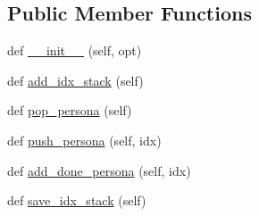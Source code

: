 \subsection*{Public Member Functions}
\begin{DoxyCompactItemize}
\item 
def \hyperlink{classparlai_1_1mturk_1_1tasks_1_1personachat_1_1personachat__rephrase_1_1worlds_1_1PersonasGenerator_a113657139eb52b53cdb044cefb9f5112}{\+\_\+\+\_\+init\+\_\+\+\_\+} (self, opt)
\item 
def \hyperlink{classparlai_1_1mturk_1_1tasks_1_1personachat_1_1personachat__rephrase_1_1worlds_1_1PersonasGenerator_af1fe911f6615919580c9beb7f1ce04c0}{add\+\_\+idx\+\_\+stack} (self)
\item 
def \hyperlink{classparlai_1_1mturk_1_1tasks_1_1personachat_1_1personachat__rephrase_1_1worlds_1_1PersonasGenerator_a3af572bb691c40bcbb9df5fe5fdb318d}{pop\+\_\+persona} (self)
\item 
def \hyperlink{classparlai_1_1mturk_1_1tasks_1_1personachat_1_1personachat__rephrase_1_1worlds_1_1PersonasGenerator_a91fac0745cf919d3ac0e8b6db2e2cd2f}{push\+\_\+persona} (self, idx)
\item 
def \hyperlink{classparlai_1_1mturk_1_1tasks_1_1personachat_1_1personachat__rephrase_1_1worlds_1_1PersonasGenerator_a457cbdea1676a5668ae903a6c4bd04e0}{add\+\_\+done\+\_\+persona} (self, idx)
\item 
def \hyperlink{classparlai_1_1mturk_1_1tasks_1_1personachat_1_1personachat__rephrase_1_1worlds_1_1PersonasGenerator_afb148eb1f60598db4637faabd8a077f1}{save\+\_\+idx\+\_\+stack} (self)
\end{DoxyCompactItemize}
